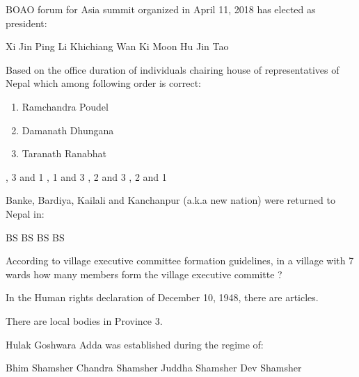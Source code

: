 \begin{questions}
\question BOAO forum for Asia summit organized in April 11, 2018 has elected as president:
  \begin{choices}
  \choice Xi Jin Ping
  \choice Li Khichiang
  \CorrectChoice Wan Ki Moon
  \choice Hu Jin Tao
  \end{choices}

\question Based on the office duration of individuals chairing house of representatives of Nepal which among following order is correct:
  \begin{enumerate}
  \item Ramchandra Poudel
  \item Damanath Dhungana
  \item Taranath Ranabhat
  \end{enumerate}
  \begin{choices}
  , 3 and 1
  , 1 and 3
  , 2 and 3
  , 2 and 1
  \end{choices}

\question Banke, Bardiya, Kailali and Kanchanpur (a.k.a new nation) were returned to Nepal in:
  \begin{choices}
   BS
   BS
   BS
   BS
  \end{choices}

\question According to village executive committee formation guidelines, in a village with 7 wards how many members form the village executive committe ?
  \begin{choices}
  \end{choices}

\question In the Human rights declaration of December 10, 1948, there are \fillin[][2cm] articles.
  \begin{choices}
  \end{choices}

\question There are \fillin[][2cm] local bodies in Province 3.
  \begin{choices}
  \end{choices}

\question Hulak Goshwara Adda was established during the regime of:
  \begin{choices}
  \choice Bhim Shamsher
  \CorrectChoice Chandra Shamsher
  \choice Juddha Shamsher
  \choice Dev Shamsher
  \end{choices}


\end{questions}
